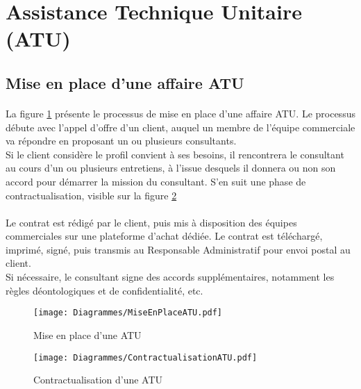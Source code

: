 \section{Assistance Technique Unitaire (ATU)}

\subsection{Mise en place d'une affaire ATU}

\paragraph{}La figure \ref{mepATU} présente le processus de mise en place d'une affaire ATU. Le processus débute avec l'appel d'offre d'un client, auquel un membre de l'équipe commerciale va répondre en proposant un ou plusieurs consultants.\\
Si le client considère le profil convient à ses besoins, il rencontrera le consultant au cours d'un ou plusieurs entretiens, à l'issue desquels il donnera ou non son accord pour démarrer la mission du consultant. S'en suit une phase de contractualisation, visible sur la figure \ref{contractATU}
\paragraph{} Le contrat est rédigé par le client, puis mis à disposition des équipes commerciales sur une plateforme d'achat dédiée. Le contrat est téléchargé, imprimé, signé, puis transmis au Responsable Administratif pour envoi postal au client.\\
Si nécessaire, le consultant signe des accords supplémentaires, notamment les règles déontologiques et de confidentialité, etc.

\begin{figure}[H]
	\centering
	\texttt{[image: Diagrammes/MiseEnPlaceATU.pdf]}
	\caption{Mise en place d'une ATU} 
	\label{mepATU}
\end{figure}
	
	
\begin{figure}[H]
	\centering
	\texttt{[image: Diagrammes/ContractualisationATU.pdf]}
	\caption{Contractualisation d'une ATU} 
	\label{contractATU}
\end{figure}

